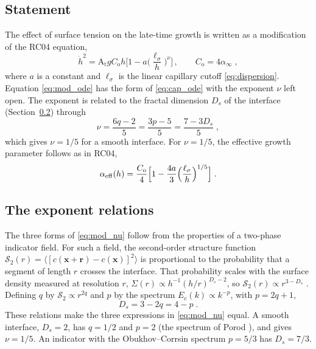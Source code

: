 \documentclass[11pt]{article}
\numberwithin{equation}{section}
\newcommand{\avg}[1]{\langle #1\rangle}
\newcommand{\At}{\mathrm{A_t}}
\newcommand{\ls}{\ell_\sigma}
\newcommand{\hd}{\dot h}
\begin{document}
\subsection{Statement}\label{sec:modified:statement}
The effect of surface tension on the late-time growth is written as a modification of the RC04 equation,
\begin{equation}\label{eq:mod_ode}
\hd^2 = \At g C_\mathrm{o} h \Big[1 - a \Big(\frac{\ls}{h}\Big)^{\nu}\Big] \, , \qquad C_\mathrm{o} = 4 \alpha_\infty \;,
\end{equation}
where $a$ is a constant and $\ls$ is the linear capillary cutoff \eqref{eq:dispersion}. Equation \eqref{eq:mod_ode} has the form of \eqref{eq:cap_ode} with the exponent $\nu$ left open. The exponent is related to the fractal dimension $D_s$ of the interface (Section~\ref{sec:modified:exponent}) through
\begin{equation}\label{eq:mod_nu}
\nu = \frac{6 q - 2}{5} = \frac{3 p - 5}{5} = \frac{7 - 3 D_s}{5} \;,
\end{equation}
which gives $\nu = 1/5$ for a smooth interface. For $\nu = 1/5$, the effective growth parameter follows as in RC04,
\begin{equation}\label{eq:mod_aeff}
\alpha_{\rm eff}(h) = \frac{C_\mathrm{o}}{4} \Big[1 - \frac{4 a}{3} \Big(\frac{\ls}{h}\Big)^{1/5}\Big] \;.
\end{equation}

\subsection{The exponent relations}\label{sec:modified:exponent}
The three forms of \eqref{eq:mod_nu} follow from the properties of a two-phase indicator field. For such a field, the second-order structure function $\mathcal{S}_2(r) = \avg{[c(\mathbf x + \mathbf r) - c(\mathbf x)]^2}$ is proportional to the probability that a segment of length $r$ crosses the interface. That probability scales with the surface density measured at resolution $r$, $\Sigma(r) \propto h^{-1}(h/r)^{D_s - 2}$, so $\mathcal{S}_2(r) \propto r^{3 - D_s}$ \cite{Sreenivasan1991}. Defining $q$ by $\mathcal{S}_2 \propto r^{2 q}$ and $p$ by the spectrum $E_c(k) \propto k^{-p}$, with $p = 2 q + 1$,
\begin{equation}\label{eq:pq_Ds}
D_s = 3 - 2 q = 4 - p \;.
\end{equation}
These relations make the three expressions in \eqref{eq:mod_nu} equal. A smooth interface, $D_s = 2$, has $q = 1/2$ and $p = 2$ (the spectrum of Porod \cite{Porod1951}), and gives $\nu = 1/5$. An indicator with the Obukhov--Corrsin spectrum $p = 5/3$ \cite{Obukhov1949,Corrsin1951} has $D_s = 7/3$.
\end{document}
